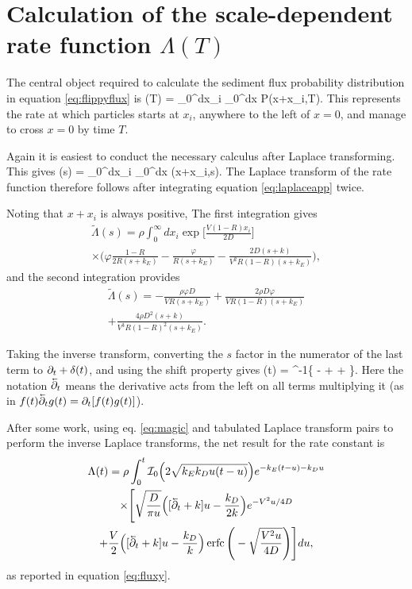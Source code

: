 \section{Calculation of the scale-dependent rate function $\Lambda(T)$}
\label{sec:fluxconstant}
The central object required to calculate the sediment flux probability distribution in equation \ref{eq:flippyflux} is 
\be \Lambda(T) = \rho \int_0^\infty dx_i \int_0^\infty dx P(x+x_i,T).\ee
This represents the rate at which particles starts at $x_i$, anywhere to the left of $x=0$, and manage to cross $x=0$ by time $T$.

Again it is easiest to conduct the necessary calculus after Laplace transforming. This gives 
\be \tilde{\Lambda}(s) = \rho \int_0^\infty dx_i \int_0^\infty dx (x+x_i,s).\ee
The Laplace transform of the rate function therefore follows after integrating equation \ref{eq:laplaceapp} twice.

Noting that $x+x_i$ is always positive,
The first integration gives
\begin{multline} \tilde{\Lambda}(s) = \rho \int_0^\infty dx_i \exp\Big[\frac{V(1-R)x_i}{2D}\Big]\\ 
	\times\Big(\varphi \frac{1-R}{2R(s+k_E)} - \frac{\varphi}{R(s+k_E)} - \frac{2D(s+k)}{V^2R(1-R)(s+k_E)}\Big), \end{multline}
and the second integration provides
\begin{multline}  \tilde{\Lambda}(s) = -\frac{\rho \varphi D}{V R(s+k_E)}  + \frac{2\rho D\varphi}{VR(1-R)(s+k_E)} \\ + \frac{4\rho D^2(s+k)}{V^3R(1-R)^2(s+k_E)}. 
	\label{eq:laplacefluxrate}\end{multline}

Taking the inverse transform, converting the $s$ factor in the numerator of the last term to $\partial_t + \delta(t)$, and using the shift property gives \citep[e.g.][]{Arfken1985}
\be \Lambda(t) = \rho {}^{-1}\Bigg\{ -  +  + \Bigg\}.\ee
Here the notation $\cev{\pt}$ means the derivative acts from the left on all terms multiplying it (as in $f(t)\cev{\pt} g(t) = \pt [f(t)g(t)]$).

After some work, using eq. \ref{eq:magic} and tabulated Laplace transform pairs \citep[e.g.][]{Arfken1985,Prudnikov1992a} to perform the inverse Laplace transforms, the net result for the rate constant is
\begin{multline} 
	\Lambda(t) = \rho \int_0^t \mathcal{I}_0\Big(2\sqrt{k_Ek_Du(t-u)}\Big)e^{-k_E(t-u)-k_D u} \\
	\times \Bigg[\sqrt{\frac{D}{\pi u}}\Big([\cev{\partial_t} + k]u-\frac{k_D}{2 k}\Big)e^{-V^2 u/4D}  \\ + \frac{V}{2}\Big([\cev{\partial_t} + k]u -\frac{k_D}{k}\Big) \erfc\Bigg(-\sqrt{\frac{V^2 u}{4D}}\Bigg)\Bigg] du,
\end{multline}
as reported in equation \ref{eq:fluxy}.

